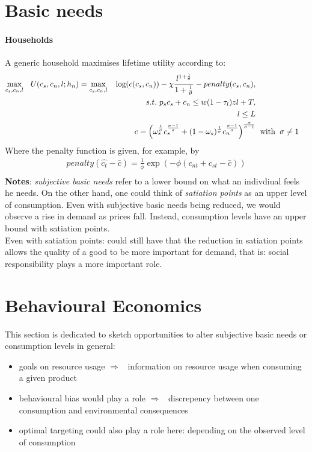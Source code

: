 \documentclass[12pt]{article}
\renewcommand{\hat}{\widehat}
\newcommand{\ar}{$\Rightarrow$ \ }
\begin{document}
\section{Basic needs}
\paragraph{Households} A generic household maximises lifetime utility according to:
\begin{align}
\underset{c_{s},c_{n}, l}{\max} \ \hspace{2mm} U(c_s, c_n, l; h_n)= \underset{c_{s},c_{n}, l}{\max} \ \hspace{2mm} \log(c(c_s,c_n))-\chi\frac{l^{1+\frac{1}{\theta}}}{1+\frac{1}{\theta}}  -penalty(c_s, c_n),
\\
s.t. \  p_{s}c_{s}+c_{n}\leq w(1-\tau_l)zl+T,\\
l\leq L \\
c =
\left(\omega_s^{\frac{1}{\sigma}}c_{s}^{\frac{\sigma-1}{\sigma}}+(1-\omega_s)^{\frac{1}{\sigma}}c_{n}^{\frac{\sigma-1}{\sigma}}\right)^{\frac{\sigma}{\sigma-1}}& \hspace{2mm} \text{with} \hspace*{2mm} \sigma \neq 1
\end{align}
Where the penalty function is given, for example, by
\begin{align*}
penalty(\hat{c_t}-\bar{c})=\frac{1}{\phi}\exp(-\phi(c_{nt}+c_{st}-\bar{c}))\\
\end{align*}
\textbf{Notes}: \textit{subjective basic needs} refer to a lower bound on what an indivdiual feels he needs. 
On the other hand, one could think of \textit{satiation points} as an upper level of consumption. 
Even with subjective basic needs being reduced, we would observe a rise in demand as prices fall. Instead, consumption levels have an upper bound with satiation points. 
\\
Even with satiation points: could still have that the reduction in satiation points allows the quality of a good to be more important for demand, that is: social responsibility plays a more important role. 

\section{Behavioural Economics}
This section is dedicated to sketch opportunities to alter subjective basic needs or consumption levels in general: 

\begin{itemize}
	\item goals on resource usage \ar information on resource usage when consuming a given product
	\item behavioural bias would play a role \ar discrepency between one consumption and environmental consequences
	\item optimal targeting could also play a role here: depending on the observed level of consumption 
\end{itemize}
\end{document}
